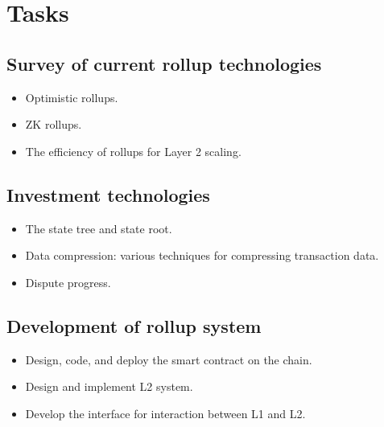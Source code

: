\documentclass{article}
\begin{document}
\section{Tasks}
\subsection{Survey of current rollup technologies}
\begin{itemize} 
\item Optimistic rollups. 
\item ZK rollups. 
\item The efficiency of rollups for Layer 2 scaling.
\end{itemize}
\subsection{Investment technologies}
\begin{itemize} 
\item The state tree and state root. 
\item Data compression: various techniques for compressing transaction data. 
\item Dispute progress.
\end{itemize}
\subsection{Development of rollup system}
\begin{itemize} 
\item Design, code, and deploy the smart contract on the chain. 
\item Design and implement L2 system. 
\item Develop the interface for interaction between L1 and L2.
\end{itemize}
\end{document}
